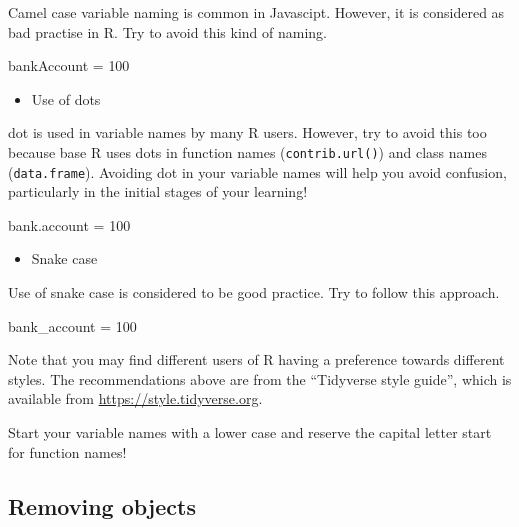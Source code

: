 \documentclass[
  letterpaper,
  DIV=11,
  numbers=noendperiod]{scrreprt}
\newenvironment{Shaded}{\begin{snugshade}}{\end{snugshade}}
\newcommand{\DecValTok}[1]{\textcolor[rgb]{0.68,0.00,0.00}{#1}}
\newcommand{\NormalTok}[1]{\textcolor[rgb]{0.00,0.23,0.31}{#1}}
\newcommand{\OtherTok}[1]{\textcolor[rgb]{0.00,0.23,0.31}{#1}}
\providecommand{\tightlist}{%
  \setlength{\itemsep}{0pt}\setlength{\parskip}{0pt}}\usepackage{longtable,booktabs,array}
\begin{document}
Camel case variable naming is common in Javascipt. However, it is
considered as bad practise in R. Try to avoid this kind of naming.

\begin{Shaded}
\begin{Highlighting}[]
\NormalTok{bankAccount }\OtherTok{=} \DecValTok{100}
\end{Highlighting}
\end{Shaded}

\begin{itemize}
\tightlist
\item
  Use of dots
\end{itemize}

dot is used in variable names by many R users. However, try to avoid
this too because base R uses dots in function names
(\texttt{contrib.url()}) and class names (\texttt{data.frame}). Avoiding
dot in your variable names will help you avoid confusion, particularly
in the initial stages of your learning!

\begin{Shaded}
\begin{Highlighting}[]
\NormalTok{bank.account }\OtherTok{=} \DecValTok{100}
\end{Highlighting}
\end{Shaded}

\begin{itemize}
\tightlist
\item
  Snake case
\end{itemize}

Use of snake case is considered to be good practice. Try to follow this
approach.

\begin{Shaded}
\begin{Highlighting}[]
\NormalTok{bank\_account }\OtherTok{=} \DecValTok{100}
\end{Highlighting}
\end{Shaded}

Note that you may find different users of R having a preference towards
different styles. The recommendations above are from the ``Tidyverse
style guide'', which is available from
\url{https://style.tidyverse.org}.

Start your variable names with a lower case and reserve the capital
letter start for function names!

\subsection{Removing objects}\label{removing-objects}
\end{document}
